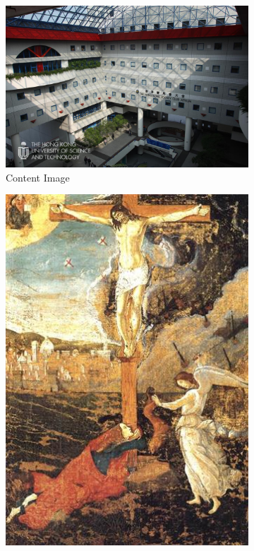 \documentclass{article}
\begin{document}
\begin{figure}[h!]
    \begin{minipage}{\textwidth}
        \centering
        \begin{subfigure}{0.25\textwidth}
            \includegraphics[width=\textwidth]{./data_set/HKUST/14.jpeg}
            \caption{Content Image}
        \end{subfigure}
        \hfill %
        \begin{subfigure}{0.25\textwidth}
            \includegraphics[width=\textwidth]{./wikiart/Early_Renaissance/sandro-botticelli_crucifixion(1).jpg}

\end{subfigure}
\end{minipage}
\end{figure}
\end{document}
